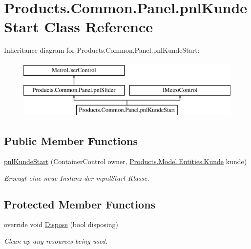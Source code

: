 \hypertarget{class_products_1_1_common_1_1_panel_1_1pnl_kunde_start}{}\section{Products.\+Common.\+Panel.\+pnl\+Kunde\+Start Class Reference}
\label{class_products_1_1_common_1_1_panel_1_1pnl_kunde_start}
Inheritance diagram for Products.\+Common.\+Panel.\+pnl\+Kunde\+Start\+:\begin{figure}[H]
\begin{center}
\leavevmode
\includegraphics[height=3.000000cm]{class_products_1_1_common_1_1_panel_1_1pnl_kunde_start}
\end{center}
\end{figure}
\subsection*{Public Member Functions}
\begin{DoxyCompactItemize}
\item 
\hyperlink{class_products_1_1_common_1_1_panel_1_1pnl_kunde_start_a3ebc63680f8bb22f535b2847f40f5440}{pnl\+Kunde\+Start} (Container\+Control owner, \hyperlink{class_products_1_1_model_1_1_entities_1_1_kunde}{Products.\+Model.\+Entities.\+Kunde} kunde)
\begin{DoxyCompactList}\small\item\em Erzeugt eine neue Instanz der mpnl\+Start Klasse. \end{DoxyCompactList}\end{DoxyCompactItemize}
\subsection*{Protected Member Functions}
\begin{DoxyCompactItemize}
\item 
override void \hyperlink{class_products_1_1_common_1_1_panel_1_1pnl_kunde_start_ac8cb496d18e5f397cfb8501c83afe5c6}{Dispose} (bool disposing)
\begin{DoxyCompactList}\small\item\em Clean up any resources being used. \end{DoxyCompactList}\end{DoxyCompactItemize}
